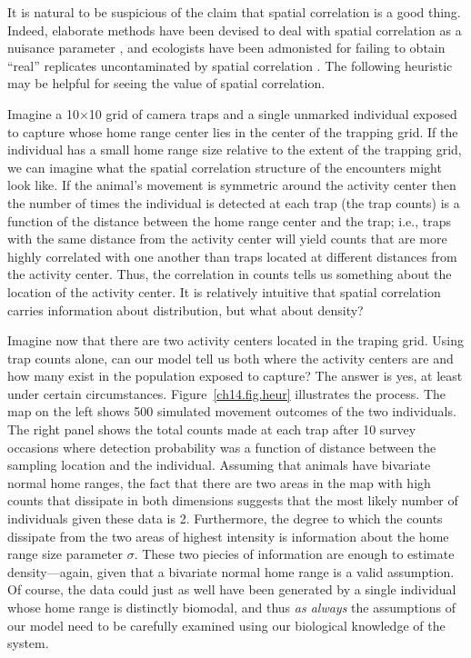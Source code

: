 It is natural to be suspicious of the claim that spatial correlation
is a good thing. Indeed, elaborate methods have been devised to deal
with spatial correlation as a nuisance parameter
\citep{dormann_etal:2007}, and ecologists have been admonisted for
failing to obtain ``real'' replicates uncontaminated by spatial
correlation \citep{hurlbert:1984}. The following heuristic may be
helpful for seeing the value of spatial correlation.

Imagine a 10$\times$10 grid of camera traps and a single unmarked
individual
exposed to capture whose home range center lies in the center of the
trapping grid. If the individual has a small home range size relative
to the extent of the trapping grid, we can imagine what the
spatial correlation structure of the encounters might look
like. If the animal's movement is symmetric around the activity center
then the number of times the individual is detected at each
trap (the trap counts) is a function of the distance between the home
range center and the trap; i.e., traps with the same distance
from the activity center will yield counts that are more highly
correlated with one another than traps located at different distances
from the activity center. Thus, the correlation in counts tells us
something about the location of the activity center. It is relatively
intuitive that spatial correlation carries information about
distribution, but what about density?

Imagine now that there are two activity centers located in the traping
grid. Using trap counts alone, %
can our model tell us both where the
activity centers are and how many exist in the population exposed to
capture? The answer is yes, at least under certain circumstances.
Figure~\ref{ch14.fig.heur} illustrates the process. The map on the
left shows 500 simulated movement outcomes of the two individuals. The
right panel shows the total counts made at each trap after 10
survey occasions where detection probability was a function of
distance between the sampling location and the individual.
Assuming that animals have bivariate normal home
ranges, the fact that there are two areas in the map with high counts
that dissipate in both dimensions suggests that the most likely number of
individuals given these data is 2. Furthermore, the degree to which
the counts dissipate from the two areas of highest intensity is
information about the home range size parameter $\sigma$. These two
piecies of information are enough to estimate density---again, given
that a bivariate normal home range is a valid assumption. Of course,
the data could just as well have been generated by a single individual
whose home range is distinctly biomodal, and thus \textit{as always}
the assumptions of our model need to be carefully examined using our
biological knowledge of the system.

